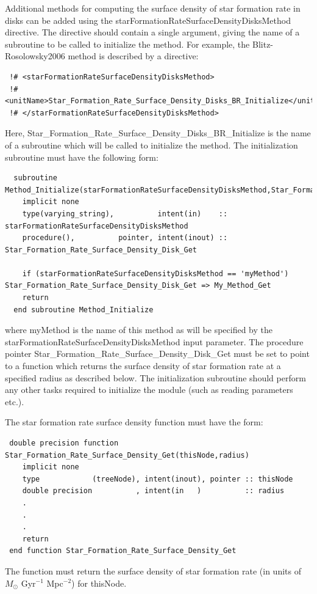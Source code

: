 Additional methods for computing the surface density of star formation rate in disks can be added using the {\normalfont \ttfamily starFormationRateSurfaceDensityDisksMethod} directive. The directive should contain a single argument, giving the name of a subroutine to be called to initialize the method. For example, the {\normalfont \ttfamily Blitz-Rosolowsky2006} method is described by a directive:
\begin{verbatim}
 !# <starFormationRateSurfaceDensityDisksMethod>
 !#  <unitName>Star_Formation_Rate_Surface_Density_Disks_BR_Initialize</unitName>
 !# </starFormationRateSurfaceDensityDisksMethod>
\end{verbatim}
Here, {\normalfont \ttfamily Star\_Formation\_Rate\_Surface\_Density\_Disks\_BR\_Initialize} is the name of a subroutine which will be called to initialize the method. The initialization subroutine must have the following form:
\begin{verbatim}
  subroutine Method_Initialize(starFormationRateSurfaceDensityDisksMethod,Star_Formation_Rate_Surface_Density_Disk_Get)
    implicit none
    type(varying_string),          intent(in)    :: starFormationRateSurfaceDensityDisksMethod
    procedure(),          pointer, intent(inout) :: Star_Formation_Rate_Surface_Density_Disk_Get
    
    if (starFormationRateSurfaceDensityDisksMethod == 'myMethod') Star_Formation_Rate_Surface_Density_Disk_Get => My_Method_Get
    return
  end subroutine Method_Initialize
\end{verbatim}
where {\normalfont \ttfamily myMethod} is the name of this method as will be specified by the {\normalfont \ttfamily starFormationRateSurfaceDensityDisksMethod} input parameter. The procedure pointer {\normalfont \ttfamily Star\_Formation\_Rate\_Surface\_Density\_Disk\_Get} must be set to point to a function which returns the surface density of star formation rate at a specified radius as described below. The initialization subroutine should perform any other tasks required to initialize the module (such as reading parameters etc.).

The star formation rate surface density function must have the form:
\begin{verbatim}
 double precision function Star_Formation_Rate_Surface_Density_Get(thisNode,radius)
    implicit none
    type            (treeNode), intent(inout), pointer :: thisNode
    double precision          , intent(in   )          :: radius
    .
    .
    .
    return
 end function Star_Formation_Rate_Surface_Density_Get
\end{verbatim}
The function must return the surface density of star formation rate (in units of $M_\odot$ Gyr$^{-1}$ Mpc$^{-2}$) for {\normalfont \ttfamily thisNode}.

